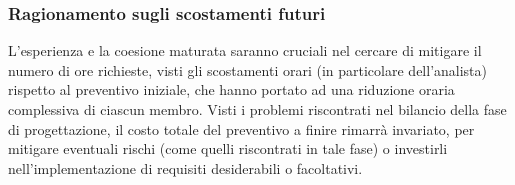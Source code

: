 \subsubsection{Ragionamento sugli scostamenti futuri}
L'esperienza e la coesione maturata saranno cruciali nel cercare di mitigare il numero di ore richieste, visti gli scostamenti orari (in particolare dell'analista) rispetto al preventivo iniziale, che hanno portato ad una riduzione oraria complessiva di ciascun membro.
Visti i problemi riscontrati nel bilancio della fase di progettazione, il costo totale del preventivo a finire rimarrà invariato, per mitigare eventuali rischi (come quelli riscontrati in tale fase) o investirli nell'implementazione di requisiti desiderabili o facoltativi.
